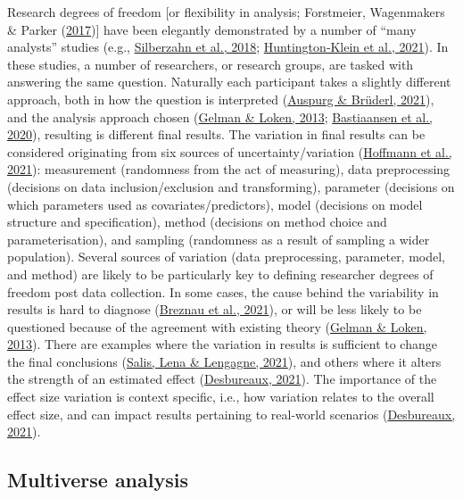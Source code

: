\documentclass[10pt,a4paper]{article}
\begin{document}
Research degrees of freedom {[}or flexibility in analysis; Forstmeier, Wagenmakers \& Parker (\protect\hyperlink{ref-forstmeier_detecting_2017}{2017}){]} have been elegantly demonstrated by a number of ``many analysts'' studies (e.g., \protect\hyperlink{ref-silberzahn_many_2018}{Silberzahn et al., 2018}; \protect\hyperlink{ref-huntingtonklein_influence_2021}{Huntington‐Klein et al., 2021}).
In these studies, a number of researchers, or research groups, are tasked with answering the same question.
Naturally each participant takes a slightly different approach, both in how the question is interpreted (\protect\hyperlink{ref-auspurg_has_2021}{Auspurg \& Brüderl, 2021}), and the analysis approach chosen (\protect\hyperlink{ref-gelman_garden_2013}{Gelman \& Loken, 2013}; \protect\hyperlink{ref-bastiaansen_time_2020}{Bastiaansen et al., 2020}), resulting is different final results.
The variation in final results can be considered originating from six sources of uncertainty/variation (\protect\hyperlink{ref-hoffmann_multiplicity_2021}{Hoffmann et al., 2021}): measurement (randomness from the act of measuring), data preprocessing (decisions on data inclusion/exclusion and transforming), parameter (decisions on which parameters used as covariates/predictors), model (decisions on model structure and specification), method (decisions on method choice and parameterisation), and sampling (randomness as a result of sampling a wider population).
Several sources of variation (data preprocessing, parameter, model, and method) are likely to be particularly key to defining researcher degrees of freedom post data collection.
In some cases, the cause behind the variability in results is hard to diagnose (\protect\hyperlink{ref-breznau_observing_2021}{Breznau et al., 2021}), or will be less likely to be questioned because of the agreement with existing theory (\protect\hyperlink{ref-gelman_garden_2013}{Gelman \& Loken, 2013}).
There are examples where the variation in results is sufficient to change the final conclusions (\protect\hyperlink{ref-salis_how_2021}{Salis, Lena \& Lengagne, 2021}), and others where it alters the strength of an estimated effect (\protect\hyperlink{ref-desbureaux_subjective_2021}{Desbureaux, 2021}).
The importance of the effect size variation is context specific, i.e., how variation relates to the overall effect size, and can impact results pertaining to real-world scenarios (\protect\hyperlink{ref-desbureaux_subjective_2021}{Desbureaux, 2021}).

\hypertarget{multiverse-analysis}{%
\subsection{Multiverse analysis}\label{multiverse-analysis}}
\end{document}
